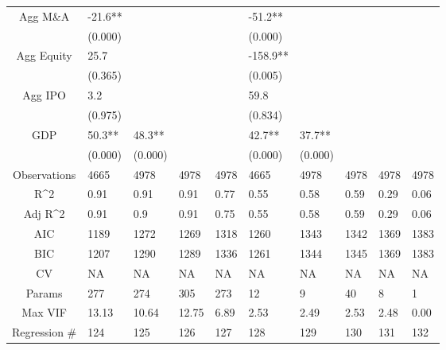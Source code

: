 \documentclass{article}
\begin{document}
\begin{table}[H]
\begin{tabular}{|clllllllll|}
  Agg M\&A & -21.6** &  &  &  & -51.2** &  &  &  &  \\
   & (0.000) &  &  &  & (0.000) &  &  &  &  \\
  Agg Equity & 25.7 &  &  &  & -158.9** &  &  &  &  \\
   & (0.365) &  &  &  & (0.005) &  &  &  &  \\
  Agg IPO & 3.2 &  &  &  & 59.8 &  &  &  &  \\
   & (0.975) &  &  &  & (0.834) &  &  &  &  \\
  GDP & 50.3** & 48.3** &  &  & 42.7** & 37.7** &  &  &  \\
   & (0.000) & (0.000) &  &  & (0.000) & (0.000) &  &  &  \\
  \hline
 Observations & 4665 & 4978 & 4978 & 4978 & 4665 & 4978 & 4978 & 4978 & 4978 \\
  R^2 & 0.91 & 0.91 & 0.91 & 0.77 & 0.55 & 0.58 & 0.59 & 0.29 & 0.06 \\
  Adj R^2 & 0.91 & 0.9 & 0.91 & 0.75 & 0.55 & 0.58 & 0.59 & 0.29 & 0.06 \\
  AIC & 1189 & 1272 & 1269 & 1318 & 1260 & 1343 & 1342 & 1369 & 1383 \\
  BIC & 1207 & 1290 & 1289 & 1336 & 1261 & 1344 & 1345 & 1369 & 1383 \\
  CV & NA & NA & NA & NA & NA & NA & NA & NA & NA \\
  Params & 277 & 274 & 305 & 273 & 12 & 9 & 40 & 8 & 1 \\
  Max VIF & 13.13 & 10.64 & 12.75 & 6.89 & 2.53 & 2.49 & 2.53 & 2.48 & 0.00 \\
  Regression \# & 124 & 125 & 126 & 127 & 128 & 129 & 130 & 131 & 132 \\
   \hline
\end{tabular}

\end{table}
\end{document}
